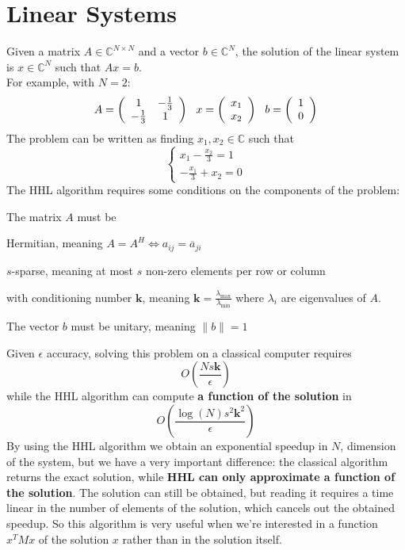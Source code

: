\documentclass[10pt]{article}
\begin{document}
\section{Linear Systems}
Given a matrix $A \in \mathbb{C}^{N\times N}$ and a vector $b\in \mathbb{C}^{N}$, the solution of the linear system is $x\in \mathbb{C}^{N}$ such that $Ax = b$.\\
For example, with $N=2$:
$$A=\left(\begin{array}{c c}
1&-\frac{1}{3}\\-\frac{1}{3}&1
\end{array}\right)\:\:\:x=\left(\begin{array}{c}
x_1\\x_2
\end{array}\right)\:\:\:b=\left(\begin{array}{c}
1\\0
\end{array}\right)$$
The problem can be written as finding $x_1,x_2\in\mathbb{C}$ such that
$$\left\{\begin{array}{l}
\displaystyle x_1-\frac{x_2}{3}=1\\
\displaystyle -\frac{x_1}{3}+x_2=0
\end{array}\right.$$
The HHL algorithm requires some conditions on the components of the problem:
\begin{list}{}{}
	\item The matrix $A$ must be
	\begin{list}{}{}
		\item Hermitian, meaning $A = A^H \Leftrightarrow a_{ij} = \overline{a}_{ji}$
		\item $s$-sparse, meaning at most $s$ non-zero elements per row or column
		\item with conditioning number $\mathbf{k}$, meaning $\mathbf{k}=\frac{\lambda_{\text{max}}}{\lambda_{\text{min}}}$ where $\lambda_i$ are eigenvalues of $A$.
	\end{list}
	\item The vector $b$ must be unitary, meaning $\|b\|=1$
\end{list}
Given $\epsilon$ accuracy, solving this problem on a classical computer requires $$O\left(\frac{Ns\mathbf{k}}{\epsilon}\right)$$ while the HHL algorithm can compute \textbf{a function of the solution} in $$O\left(\frac{\log(N)s^2\mathbf{k}^2}{\epsilon}\right)$$
By using the HHL algorithm we obtain an exponential speedup in $N$, dimension of the system, but we have a very important difference: the classical algorithm returns the exact solution, while \textbf{HHL can only approximate a function of the solution}. The solution can still be obtained, but reading it requires a time linear in the number of elements of the solution, which cancels out the obtained speedup. So this algorithm is very useful when we're interested in a function $x^TMx$ of the solution $x$ rather than in the solution itself.
\end{document}
